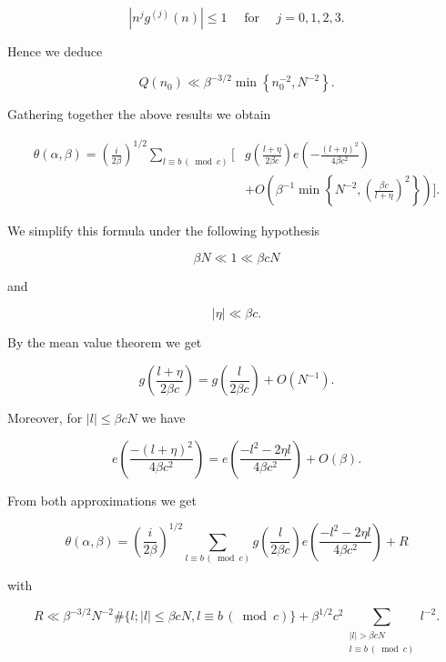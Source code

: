\documentclass[10pt]{article}
\begin{document}
\begin{equation*}
\left|n^{j} g^{(j)}(n)\right| \leqslant 1 \quad \text { for } \quad j=0,1,2,3 . \tag{9.3}
\end{equation*}


Hence we deduce

$$
Q\left(n_{0}\right) \ll \beta^{-3 / 2} \min \left\{n_{0}^{-2}, N^{-2}\right\} .
$$

Gathering together the above results we obtain

$$
\begin{aligned}
\theta(\alpha,\beta)=\left(\frac{i}{2\beta}\right)^{1/2}
\sum_{l\equiv b\, (\bmod c)}\Bigg[&g\left(\frac{l+\eta}{2\beta c}\right)
 e\left(-\frac{(l+\eta)^{2}}{4\beta c^{2}}\right)\\
&+O\left(\beta^{-1}\min\left\{N^{-2},
\left(\frac{\beta c}{l+\eta}\right)^{2}\right\}\right)\Bigg].
\end{aligned}
$$

We simplify this formula under the following hypothesis


\begin{equation*}
\beta N \ll 1 \ll \beta c N \tag{9.4}
\end{equation*}


and


\begin{equation*}
|\eta| \ll \beta c . \tag{9.5}
\end{equation*}


By the mean value theorem we get

$$
g\left(\frac{l+\eta}{2\beta c}\right)=g\left(\frac{l}{2\beta c}\right)+O\left(N^{-1}\right) .
$$

Moreover, for $|l| \leqslant \beta c N$ we have

$$
e\left(\frac{-(l+\eta)^{2}}{4 \beta c^{2}}\right)=e\left(\frac{-l^{2}-2 \eta l}{4 \beta c^{2}}\right)+O(\beta) .
$$

From both approximations we get


\begin{equation*}
\theta(\alpha, \beta)=\left(\frac{i}{2 \beta}\right)^{1 / 2} \sum_{l \equiv b\, (\bmod c)} g\left(\frac{l}{2 \beta c}\right) e\left(\frac{-l^{2}-2 \eta l}{4 \beta c^{2}}\right)+R \tag{9.6}
\end{equation*}


with

$$
R \ll \beta^{-3 / 2} N^{-2} \#\{l ;|l| \leqslant \beta c N, l \equiv b\, (\bmod c)\}+\beta^{1 / 2} c^{2} \sum_{\substack{|l|>\beta c N \\ l \equiv b\, (\bmod c)}} l^{-2} .
$$
\end{document}
